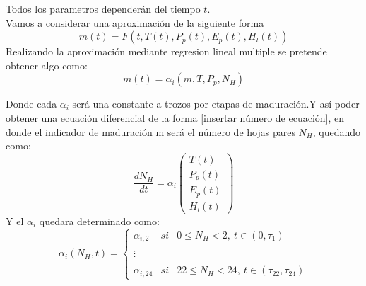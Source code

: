 \documentclass[utf8]{FrontiersinHarvard} %
\begin{document}
Todos los parametros dependerán  del tiempo $t$.\\
Vamos a considerar una aproximación de la siguiente forma 
\begin{equation}
    m(t)= F(t,T(t),P_p(t),E_p(t),H_l(t))
    \label{eq:aproximacion}
\end{equation}
Realizando la aproximación mediante regresion lineal multiple se pretende obtener algo como:
\begin{equation}
    m(t)=\alpha_i (m,T,P_p,N_H)
    \label{eq:aproximacionRLM}
\end{equation}

Donde cada $\alpha_i$ será una constante a trozos por etapas de maduración.Y así poder obtener una ecuación diferencial de la forma [insertar número de ecuación], en donde el indicador de maduración m será el número de hojas pares $N_H$, quedando como:
\begin{equation}
    \frac{dN_H}{dt}=\alpha_i \begin{pmatrix}
        T(t)  
        \\ P_p(t)
        \\E_p(t)
        \\H_l(t)
    \end{pmatrix}
\end{equation}
Y el $\alpha_i$ quedara determinado como:
\begin{equation}
    \alpha_i(N_H,t)= \left\{ \begin{array}{lcc} \alpha_{i,2} & si & 0 \leq N_H < 2, \ t \in (0,\tau_1) \\ \\ 
        \vdots \\ \\ 
        \alpha_{i,24} & si & 22 \leq N_H < 24, \ t \in (\tau_{22},\tau_{24})
    \end{array} \right.
\end{equation}
\end{document}
